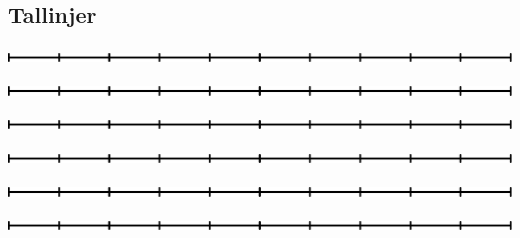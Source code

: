 




\subsection{Tallinjer}
	\info
	{
	}
	{
	}
	{}
	{}
{
}


\newpage
\thispagestyle{empty}
\begin{center}
	\includegraphics[]{10}
\end{center} 
\vspace{2cm}
\begin{center}
	\includegraphics[]{10}
\end{center}
\vspace{2cm}
\begin{center}
	\includegraphics[]{10}
\end{center}
\vspace{2cm}
\begin{center}
	\includegraphics[]{10}
\end{center}
\vspace{2cm}
\begin{center}
	\includegraphics[]{10}
\end{center}
\vspace{2cm}
\begin{center}
	\includegraphics[]{10}
\end{center}
